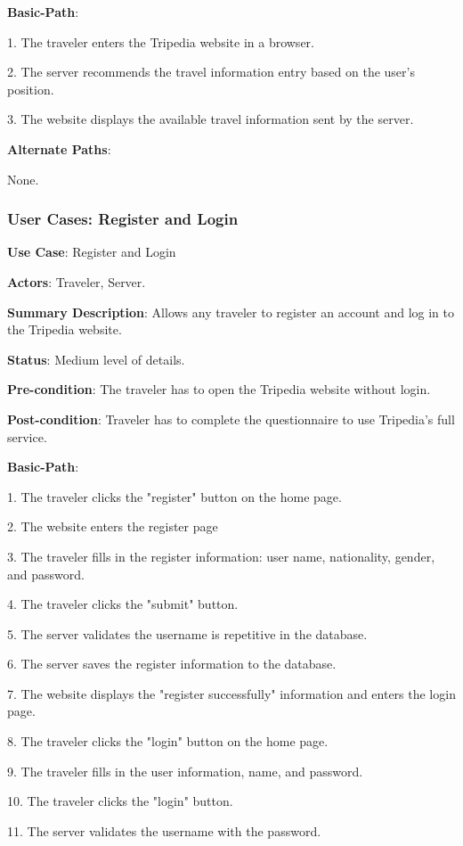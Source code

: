 \documentclass[conference]{IEEEtran}
\begin{document}
\textbf{Basic-Path}:

1. The traveler enters the Tripedia website in a browser.

2. The server recommends the travel information entry based on the user's position.

3. The website displays the available travel information sent by the server.

\textbf{Alternate Paths}:

None.

\subsubsection{User Cases: Register and Login}

\textbf{ }

\textbf{Use Case}: Register and Login

\textbf{Actors}: Traveler, Server.

\textbf{Summary Description}: Allows any traveler to register an account and log in to the Tripedia website.
 
\textbf{Status}: Medium level of details.

\textbf{Pre-condition}: The traveler has to open the Tripedia website without login.

\textbf{Post-condition}: Traveler has to complete the questionnaire to use Tripedia's full service.

\textbf{Basic-Path}:

1. The traveler clicks the "register" button on the home page.

2. The website enters the register page

3. The traveler fills in the register information: user name, nationality, gender, and password. 

4. The traveler clicks the "submit" button.

5. The server validates the username is repetitive in the database.

6. The server saves the register information to the database.

7. The website displays the "register successfully" information and enters the login page.

8. The traveler clicks the "login" button on the home page.

9. The traveler fills in the user information, name, and password. 

10. The traveler clicks the "login" button.

11. The server validates the username with the password.
\end{document}
